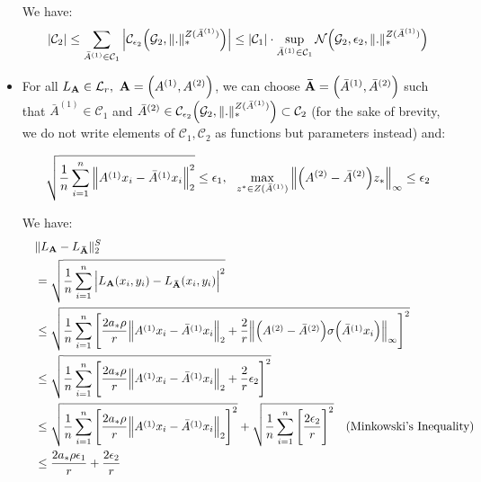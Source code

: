 \begin{itemize}
    We have:
    \begin{align*}
        |\mathcal{C}_2| \le \sum_{\bar A^{(1)} \in \mathcal{C}_1} \Big| 
            \mathcal{C}_{\epsilon_2} \Big( 
                \mathcal{G}_2, \|.\|_*^{Z(\bar A^{(1)})}
             \Big) 
         \Big| \le |\mathcal{C}_1| \cdot \sup_{\bar A^{(1)} \in \mathcal{C}_1} \mathcal{N}\Big( 
            \mathcal{G}_2, \epsilon_2, \|.\|_*^{Z(\bar A^{(1)})}
         \Big)
    \end{align*}

    \item For all $L_\vecbf{A}\in\mathcal{L}_r, \ \vecbf{A}=\Big(A^{(1)}, A^{(2)}\Big)$, we can choose ${\bf \bar A}=\Big( \bar A^{(1)}, \bar A^{(2)} \Big)$ such that $\bar A^{(1)} \in \mathcal{C}_1$ and $\bar A^{(2)} \in \mathcal{C}_{\epsilon_2}\Big( \mathcal{G}_2, \|.\|_*^{Z(\bar A^{(1)})} \Big)\subset\mathcal{C}_2$ (for the sake of brevity, we do not write elements of $\mathcal{C}_1, \mathcal{C}_2$ as functions but parameters instead) and:

    \begin{align*}
        \sqrt{
            \frac{1}{n} \sum_{i=1}^n \Big\|
                A^{(1)}x_i - \bar A^{(1)}x_i
            \Big\|_2^2 
        } \le \epsilon_1, \ \
        \max_{z^* \in Z(\bar A^{(1)})} \Big\| \Big( A^{(2)} - \bar A^{(2)} \Big)z_* \Big\|_\infty \le \epsilon_2
    \end{align*}

    We have:
    \begin{align*}
        &\|L_{\bf A} - L_{\bf \bar A}\|_2^S \\
        \ \ \ &= 
        \sqrt{\frac{1}{n}\sum_{i=1}^n\Big| 
            L_{\bf A}(x_i, y_i) - L_{\bf \bar A}(x_i, y_i) 
         \Big|^2} \\
        &\le \sqrt{
            \frac{1}{n}\sum_{i=1}^n
            \Bigg[ 
                \frac{2a_*\rho}{r} \Big\|A^{(1)}x_i - \bar A^{(1)}x_i\Big\|_2 + \frac{2}{r}\Big\| \Big( 
                    A^{(2)} - \bar A^{(2)}
                 \Big)\sigma\Big( \bar A^{(1)}x_i \Big) \Big\|_\infty
             \Bigg]^2
        } \\
        &\le \sqrt{
            \frac{1}{n}\sum_{i=1}^n
            \Bigg[ 
                \frac{2a_*\rho}{r} \Big\|A^{(1)}x_i - \bar A^{(1)}x_i\Big\|_2 + \frac{2}{r}\epsilon_2
             \Bigg]^2
        } \\
        &\le \sqrt{
            \frac{1}{n}\sum_{i=1}^n \Bigg[ 
                \frac{2a_*\rho}{r} \Big\| 
                    A^{(1)}x_i - \bar A^{(1)}x_i
                \Big\|_2
             \Bigg]^2
        } + \sqrt{
            \frac{1}{n}\sum_{i=1}^n\Bigg[ 
                \frac{2\epsilon_2}{r}
             \Bigg]^2
        } \ \ \ \text{(Minkowski's Inequality)} \\
        &\le \frac{2a_*\rho\epsilon_1}{r} + \frac{2\epsilon_2}{r}
    \end{align*}


\end{itemize}
